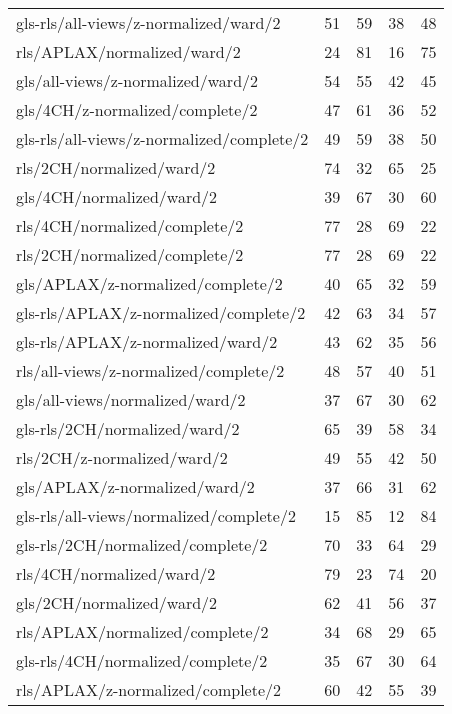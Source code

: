\begin{longtable}{lrrrr}
    gls-rls/all-views/z-normalized/ward/2     & 51 & 59 & 38 & 48 \\
    rls/APLAX/normalized/ward/2               & 24 & 81 & 16 & 75 \\
    gls/all-views/z-normalized/ward/2         & 54 & 55 & 42 & 45 \\
    gls/4CH/z-normalized/complete/2           & 47 & 61 & 36 & 52 \\
    gls-rls/all-views/z-normalized/complete/2 & 49 & 59 & 38 & 50 \\
    rls/2CH/normalized/ward/2                 & 74 & 32 & 65 & 25 \\
    gls/4CH/normalized/ward/2                 & 39 & 67 & 30 & 60 \\
    rls/4CH/normalized/complete/2             & 77 & 28 & 69 & 22 \\
    rls/2CH/normalized/complete/2             & 77 & 28 & 69 & 22 \\
    gls/APLAX/z-normalized/complete/2         & 40 & 65 & 32 & 59 \\
    gls-rls/APLAX/z-normalized/complete/2     & 42 & 63 & 34 & 57 \\
    gls-rls/APLAX/z-normalized/ward/2         & 43 & 62 & 35 & 56 \\
    rls/all-views/z-normalized/complete/2     & 48 & 57 & 40 & 51 \\
    gls/all-views/normalized/ward/2           & 37 & 67 & 30 & 62 \\
    gls-rls/2CH/normalized/ward/2             & 65 & 39 & 58 & 34 \\
    rls/2CH/z-normalized/ward/2               & 49 & 55 & 42 & 50 \\
    gls/APLAX/z-normalized/ward/2             & 37 & 66 & 31 & 62 \\
    gls-rls/all-views/normalized/complete/2   & 15 & 85 & 12 & 84 \\
    gls-rls/2CH/normalized/complete/2         & 70 & 33 & 64 & 29 \\
    rls/4CH/normalized/ward/2                 & 79 & 23 & 74 & 20 \\
    gls/2CH/normalized/ward/2                 & 62 & 41 & 56 & 37 \\
    rls/APLAX/normalized/complete/2           & 34 & 68 & 29 & 65 \\
    gls-rls/4CH/normalized/complete/2         & 35 & 67 & 30 & 64 \\
    rls/APLAX/z-normalized/complete/2         & 60 & 42 & 55 & 39 \\

\end{longtable}
